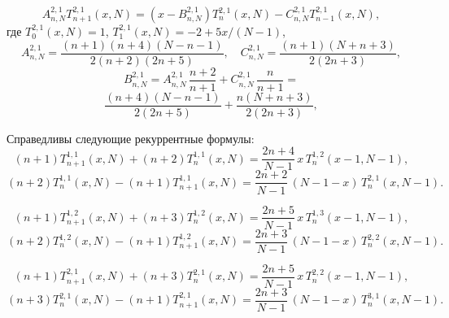 \documentclass[12pt]{book}
\begin{document}
\begin{equation*}
  A^{2,1}_{n,N} T^{2,1}_{n+1}(x,N) = (x-B^{2,1}_{n,N}) T^{2,1}_{n}(x,N) - C^{2,1}_{n,N} T^{2,1}_{n-1}(x,N),
\end{equation*}
где $T^{2,1}_{0}(x,N)=1$, $T^{2,1}_{1}(x,N)=-2+5x/(N-1)$,
\begin{equation*}
  A^{2,1}_{n,N} = \frac{(n+1)(n+4)(N-n-1)}{2(n+2)(2n+5)},
\quad
  C^{2,1}_{n,N} = \frac{(n+1)(N+n+3)}{2(2n+3)},
\end{equation*}
\begin{equation*}
  B^{2,1}_{n,N} = A^{2,1}_{n,N}\,\frac{n+2}{n+1}+C^{2,1}_{n,N}\,\frac{n}{n+1}=
\end{equation*}
\begin{equation*}
  \frac{(n+4)(N-n-1)}{2(2n+5)}+\frac{n(N+n+3)}{2(2n+3)},
\end{equation*}


Справедливы следующие рекуррентные формулы:
\begin{equation*}
  (n+1) T^{1,1}_{n+1}(x,N) + (n+2)T^{1,1}_{n}(x,N) = \frac{2n+4}{N-1}\,x\,T^{1,2}_{n}(x-1,N-1),
\end{equation*}
\begin{equation*}
  (n+2) T^{1,1}_{n}(x,N) - (n+1)T^{1,1}_{n+1}(x,N) = \frac{2n+2}{N-1}\,(N-1-x)\,T^{2,1}_{n}(x,N-1).
\end{equation*}

\begin{equation*}
  (n+1) T^{1,2}_{n+1}(x,N) + (n+3)T^{1,2}_{n}(x,N) = \frac{2n+5}{N-1}\,x\,T^{1,3}_{n}(x-1,N-1),
\end{equation*}
\begin{equation*}
  (n+2) T^{1,2}_{n}(x,N) - (n+1)T^{1,2}_{n+1}(x,N) = \frac{2n+3}{N-1}\,(N-1-x)\,T^{2,2}_{n}(x,N-1).
\end{equation*}

\begin{equation*}
  (n+1) T^{2,1}_{n+1}(x,N) + (n+3)T^{2,1}_{n}(x,N) = \frac{2n+5}{N-1}\,x\,T^{2,2}_{n}(x-1,N-1),
\end{equation*}
\begin{equation*}
  (n+3) T^{2,1}_{n}(x,N) - (n+1)T^{2,1}_{n+1}(x,N) = \frac{2n+3}{N-1}\,(N-1-x)\,T^{3,1}_{n}(x,N-1).
\end{equation*}
\end{document}
